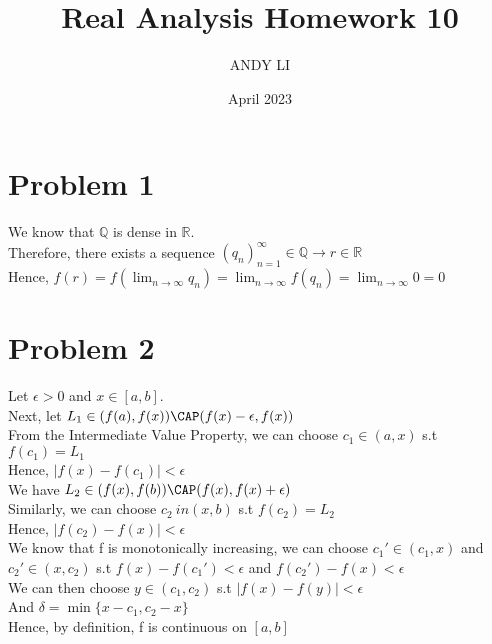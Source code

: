 \documentclass{article}
\title{Real Analysis Homework 10}
\author{ANDY LI}
\date{April 2023}
\begin{document}
\maketitle
\section*{Problem 1}
We know that $\mathbb{Q}$ is dense in $\mathbb{R}$.
\\Therefore, there exists a sequence $(q_n)_{n = 1}^\infty \in \mathbb{Q} \to r \in \mathbb{R}$
\\Hence, $f(r) = f(\lim_{n \to \infty}q_n) = \lim_{n \to \infty}f(q_n) = \lim_{n \to \infty}0 = 0$    

\section*{Problem 2}
Let $\epsilon > 0$ and $x \in [a, b]$.
\\Next, let $L_1 \in (f(a), f(x)) \CAP (f(x) - \epsilon, f(x))$
\\From the Intermediate Value Property, we can choose $c_1 \in (a, x)$ s.t $f(c_1) = L_1$
\\Hence, $|f(x) - f(c_1)| < \epsilon$
\\We have $L_2 \in (f(x), f(b)) \CAP (f(x), f(x) + \epsilon)$
\\Similarly, we can choose $c_2 \ in (x, b)$ s.t $f(c_2) = L_2$
\\Hence, $|f(c_2) - f(x)| < \epsilon$
\\We know that f is monotonically increasing, we can choose $c_1' \in (c_1, x)$ and $c_2' \in (x, c_2)$ s.t $f(x) - f(c_1') < \epsilon$ and $f(c_2') - f(x) < \epsilon$
\\We can then choose $y \in (c_1, c_2)$ s.t $|f(x) - f(y)| < \epsilon$
\\And $\delta = \min\{x - c_1, c_2 - x\}$
\\Hence, by definition, f is continuous on $[a, b]$
\end{document}
